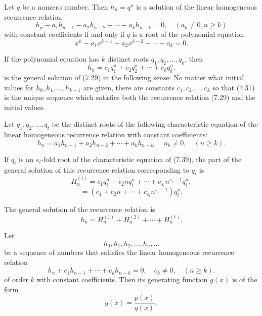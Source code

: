 \begin{theorem}
  \label{thm:7.4.1}
Let $q$ be a nonzero number. Then $h_n = q^n$ is a solution of the linear homogeneous recurrence relation
\[
    h_n - a_1 h_{n-1} - a_2 h_{n-2} - \cdots - a_k h_{n-k} = 0, \quad (a_k \neq 0, n \geq k) \tag{7.29}
\]
with constant coefficients if and only if $q$ is a root of the polynomial equation
\[
    x^k - a_1 x^{k-1} - a_2 x^{k-2} - \cdots - a_k = 0. \tag{7.30}
\]

If the polynomial equation has $k$ distinct roots $q_1, q_2, \dots, q_k$, then
\[
h_n = c_1 q_1^n + c_2 q_2^n + \cdots + c_k q_k^n. \tag{7.31}
\]
is the general solution of (7.29) in the following sense: No matter what initial values for 
$h_0, h_1, \dots, h_{k-1}$ are given, there are constants $c_1, c_2, \dots, c_k$ so that (7.31) 
is the unique sequence which satisfies both the recurrence relation (7.29) and the initial values.


\end{theorem}


\begin{theorem}
    \label{thm:7.4.2}
 Let $q_1, q_2, \dots, q_t$ be the distinct roots of the following characteristic equation of the linear homogeneous recurrence relation with constant coefficients:
\[
    h_n = a_1 h_{n-1} + a_2 h_{n-2} + \cdots + a_k h_{n-k}, \quad a_k \neq 0, \quad (n \geq k). \tag{7.39}
\]

If $q_i$ is an $s_i$-fold root of the characteristic equation of (7.39), the part of the general solution of this recurrence relation corresponding to $q_i$ is
\[
H_n^{(i)} = c_1 q_i^n + c_2 n q_i^n + \cdots + c_{s_i} n^{s_i-1} q_i^n,
\]
\[
= (c_1 + c_2 n + \cdots + c_{s_i} n^{s_i-1}) q_i^n.
\]

The general solution of the recurrence relation is
\[
h_n = H_n^{(1)} + H_n^{(2)} + \cdots + H_n^{(t)}.
\]

\end{theorem}



\begin{theorem}
    \label{thm:7.4.3}
Let 
\[
h_0, h_1, h_2, \dots, h_n, \dots
\]
be a sequence of numbers that satisfies the linear homogeneous recurrence relation
\[
    h_n + c_1 h_{n-1} + \cdots + c_k h_{n-k} = 0, \quad c_k \neq 0, \quad (n \geq k). \tag{7.42}
\]
of order $k$ with constant coefficients. Then its generating function $g(x)$ is of the form
\[
    g(x) = \frac{p(x)}{q(x)}, \tag{7.43}
\]
\end{theorem}



